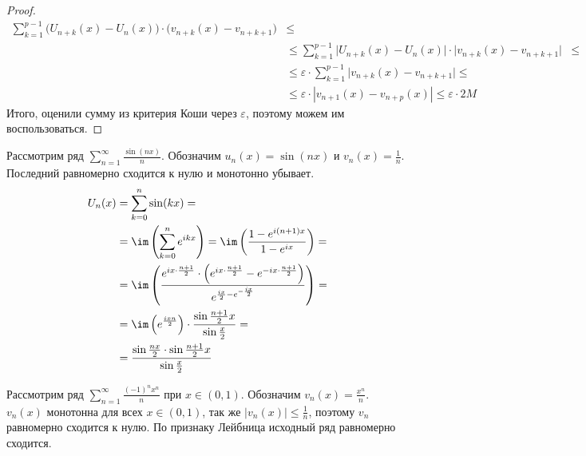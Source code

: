 \begin{prop}
\begin{enumerate}
\begin{proof}
				\[
					\begin{aligned}
						\sum_{k=1}^{p-1} \bigl(U_{n+k}(x) - U_n(x)\bigr) \cdot \bigl(v_{n+k}(x) - v_{n+k+1}\bigr) &\le \\
																												  & \le \sum_{k=1}^{p-1} \bigl|U_{n+k}(x) - U_n(x)\bigr| \cdot \bigl|v_{n+k}(x) - v_{n+k+1}\bigr| &\le \\
																												  & \le \varepsilon \cdot \sum_{k=1}^{p-1} \bigl|v_{n+k}(x) - v_{n+k+1}\bigr| \le \\
																												  & \le \varepsilon \cdot \left| v_{n+1}(x) - v_{n+p}(x) \right|  \le \varepsilon \cdot 2 M
					\end{aligned}
				\]
				Итого, оценили сумму из критерия Коши через $ \varepsilon $, поэтому можем им воспользоваться.
			\end{proof}
	\end{enumerate}
\end{prop}

		\fontAwesomeSymbol{\faWindows}

			\begin{ex}
				Рассмотрим ряд $ \sum_{n=1}^{\infty} \frac{\sin(nx)}{n}$. Обозначим $ u_n(x) = \sin(nx)$ и $ v_n(x) = \frac{1}{n}$. Последний равномерно сходится к нулю и монотонно убывает.
				\[
					\begin{aligned}
						U_n(x) &= \sum_{k=0}^{n} \sin(kx) = \\
							   &= \im\left(  \sum_{k=0}^{n} e^{ikx}  \right) = \im \left( \frac{1-e^{i(n+1)x}}{1 - e^{ix}} \right) = \\
							   &= \im\left( \frac{e^{ix\cdot \frac{n+1}{2}} \cdot \left( e^{ix\cdot \frac{n+1}{2}}- e^{-ix\cdot \frac{n+1}{2}} \right)}{e^{\frac{ix}{2} - e^{-\frac{ix}{2}}}}  \right)  = \\
							   &= \im \left( e^{\frac{ixn}{2}} \right) \cdot \frac{\sin \frac{n+1}{2}x }{\sin  \frac{x}{2} } = \\
							   &= \frac{\sin \frac{nx}{2} \cdot \sin\frac{n+1}{2}x}{\sin \frac{x}{2}}
					\end{aligned}
				\]
			\end{ex}
			\begin{ex}
				Рассмотрим ряд $ \sum_{n=1}^{\infty} \frac{(-1)^{n}x^{n}}{n}$ при $ x \in (0, 1)$. Обозначим $ v_n(x) = \frac{x^{n}}{n}$. $ v_n(x)$ монотонна для всех $ x \in (0, 1)$, так же  $ \lvert v_n(x) \rvert \le \frac{1}{n}$, поэтому $ v_n$ равномерно сходится к нулю.  По признаку Лейбница исходный ряд равномерно сходится.
			\end{ex}

